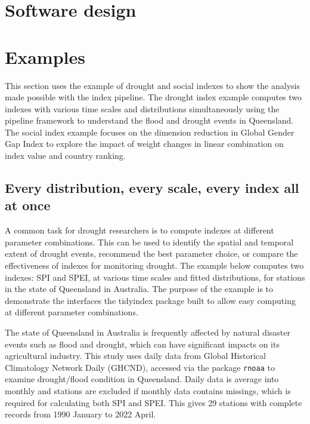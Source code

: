 \documentclass[
]{interact}
\begin{document}
\hypertarget{sec-dev}{%
\section{Software design}\label{sec-dev}}

\hypertarget{sec-examples}{%
\section{Examples}\label{sec-examples}}

This section uses the example of drought and social indexes to show the
analysis made possible with the index pipeline. The drought index
example computes two indexes with various time scales and distributions
simultaneously using the pipeline framework to understand the flood and
drought events in Queensland. The social index example focuses on the
dimension reduction in Global Gender Gap Index to explore the impact of
weight changes in linear combination on index value and country ranking.

\hypertarget{every-distribution-every-scale-every-index-all-at-once}{%
\subsection{Every distribution, every scale, every index all at
once}\label{every-distribution-every-scale-every-index-all-at-once}}

A common task for drought researchers is to compute indexes at different
parameter combinations. This can be used to identify the spatial and
temporal extent of drought events, recommend the best parameter choice,
or compare the effectiveness of indexes for monitoring drought. The
example below computes two indexes: SPI and SPEI, at various time scales
and fitted distributions, for stations in the state of Queensland in
Australia. The purpose of the example is to demonstrate the interfaces
the tidyindex package built to allow easy computing at different
parameter combinations.

The state of Queensland in Australia is frequently affected by natural
disaster events such as flood and drought, which can have significant
impacts on its agricultural industry. This study uses daily data from
Global Historical Climatology Network Daily (GHCND), accessed via the
package \texttt{rnoaa} to examine drought/flood condition in Queensland.
Daily data is average into monthly and stations are excluded if monthly
data contains missings, which is required for calculating both SPI and
SPEI. This gives 29 stations with complete records from 1990 January to
2022 April.
\end{document}
